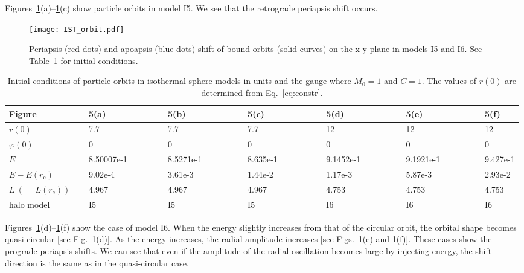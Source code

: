 \documentclass[aps,11pt,nofootinbib,preprintnumbers,groupedaddress,superscriptaddress]{revtex4-2}
\begin{document}
Figures~\ref{fig:nonliniso}(a)--\ref{fig:nonliniso}(c) show particle orbits in model I5. 
We see that the retrograde 
periapsis shift 
occurs.
\begin{figure}[t]
\centering
\texttt{[image: IST\_orbit.pdf]}
\caption{
Periapsis (red dots) and apoapsis (blue dots) shift of bound orbits (solid curves) on the x-y plane in models I5 and I6. See Table~\ref{table:ISOini} for initial conditions.
}
\label{fig:nonliniso}
\end{figure}
%
\begin{table}
\begin{tabular}{lllllll}
\hline
\hline
Figure~~~~~~~~~
&5(a)~~~~~~~~~~~
&5(b)~~~~~~~~~~~
&5(c)~~~~~~~~~~~
&5(d)~~~~~~~~~~~
&5(e)~~~~~~~~~~~
&5(f)
\\
\hline
$r(0)$&7.7&7.7&7.7&12&12&12
\\
$\varphi(0)$&0&0&0&0&0&0
\\
$E$&8.50007e-1&8.5271e-1&8.635e-1&9.1452e-1&9.1921e-1&9.427e-1
\\
$E-E(r_{\mathrm{c}})$&9.02e-4&3.61e-3&1.44e-2&1.17e-3&5.87e-3&2.93e-2
\\
$L\:\!(=L(r_{\mathrm{c}}))$&4.967&4.967&4.967&4.753&4.753&4.753
\\
halo model&I5&I5&I5&I6&I6&I6
\\
\hline\hline
\end{tabular}
\caption{Initial conditions of particle orbits in isothermal sphere models in units and the gauge where $M_0=1$ and $C=1$. The values of $\dot{r}(0)$ are determined from Eq.~\eqref{eq:constr}.}
\label{table:ISOini}
\end{table}
Figures~\ref{fig:nonliniso}(d)--\ref{fig:nonliniso}(f) show the case of model I6. 
When the energy slightly increases
from that of the circular orbit, 
the orbital shape becomes 
quasi-circular
[see Fig.~\ref{fig:nonliniso}(d)]. 
As the energy increases, 
the radial amplitude increases [see Figs.~\ref{fig:nonliniso}(e) and \ref{fig:nonliniso}(f)].
These cases show the prograde 
periapsis shifts. 
We can see that even if the amplitude of the radial oscillation becomes large by injecting energy, the shift direction is the same as 
in the 
quasi-circular
case. 



\end{document}
